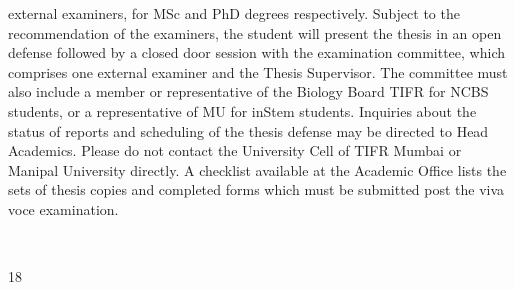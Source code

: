 \documentclass[a4paper,10pt]{article}
\begin{document}
external examiners, for MSc and PhD degrees respectively. Subject to the recommendation
of the examiners, the student will present the thesis in an open defense followed by a closed
door session with the examination committee, which comprises one external examiner and
the Thesis Supervisor. The committee must also include a member or representative of the
Biology Board TIFR for NCBS students, or a representative of MU for inStem students.
Inquiries about the status of reports and scheduling of the thesis defense may be directed to
Head Academics. Please do not contact the University Cell of TIFR Mumbai or Manipal
University directly. A checklist available at the Academic Office lists the sets of thesis
copies and completed forms which must be submitted post the viva voce examination.
	
  

18	
  
\end{document}
